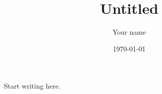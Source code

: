 \documentclass[11pt]{article}
\title{Untitled}   %
\author{Your name} %
\date{\today}      %
\begin{document}
\maketitle

Start writing here.
\end{document}
